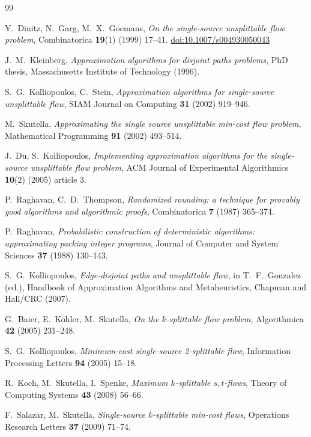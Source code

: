 \documentclass[11pt]{article}
\theoremstyle{remark}
\newcommand{\doi}[1]{\href{https://doi.org/#1}{doi:#1}}
\begin{document}
{\raggedright
\begin{thebibliography}{99}

 Y.\ Dinitz, N.\ Garg, M.\ X.\ Goemans, \emph{On the single-source unsplittable flow problem}, Combinatorica \textbf{19}(1) (1999) 17--41. \doi{10.1007/s004930050043}

 J.\ M.\ Kleinberg, \emph{Approximation algorithms for disjoint paths problems}, PhD thesis, Massachusetts Institute of Technology (1996).

 S.\ G.\ Kolliopoulos, C.\ Stein, \emph{Approximation algorithms for single-source unsplittable flow}, SIAM Journal on Computing \textbf{31} (2002) 919--946.

 M.\ Skutella, \emph{Approximating the single source unsplittable min-cost flow problem}, Mathematical Programming \textbf{91} (2002) 493--514.

 J.\ Du, S.\ Kolliopoulos, \emph{Implementing approximation algorithms for the single-source unsplittable flow problem}, ACM Journal of Experimental Algorithmics \textbf{10}(2) (2005) article 3.

 P.\ Raghavan, C.\ D.\ Thompson, \emph{Randomized rounding: a technique for provably good algorithms and algorithmic proofs}, Combinatorica \textbf{7} (1987) 365--374.

 P.\ Raghavan, \emph{Probabilistic construction of deterministic algorithms: approximating packing integer programs}, Journal of Computer and System Sciences \textbf{37} (1988) 130--143.

 S.\ G.\ Kolliopoulos, \emph{Edge-disjoint paths and unsplittable flow}, in T.\ F.\ Gonzalez (ed.), Handbook of Approximation Algorithms and Metaheuristics, Chapman and Hall/CRC (2007).

 G.\ Baier, E.\ K\"ohler, M.\ Skutella, \emph{On the $k$-splittable flow problem}, Algorithmica \textbf{42} (2005) 231--248.

 S.\ G.\ Kolliopoulos, \emph{Minimum-cost single-source 2-splittable flow}, Information Processing Letters \textbf{94} (2005) 15--18.

 R.\ Koch, M.\ Skutella, I.\ Spenke, \emph{Maximum $k$-splittable $s,t$-flows}, Theory of Computing Systems \textbf{43} (2008) 56--66.

 F.\ Salazar, M.\ Skutella, \emph{Single-source $k$-splittable min-cost flows}, Operations Research Letters \textbf{37} (2009) 71--74.


\end{thebibliography}}
\end{document}
